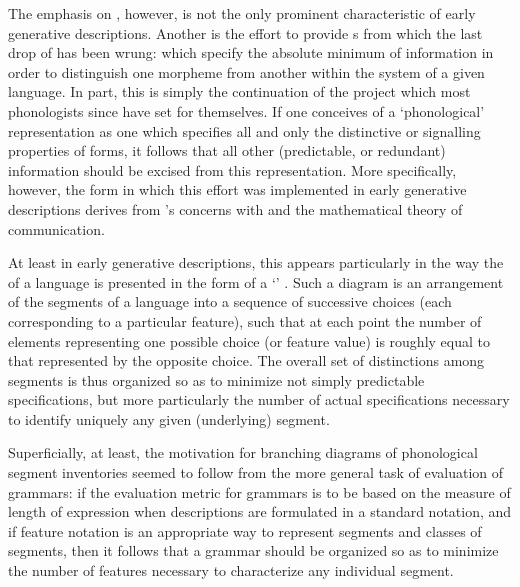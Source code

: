 The emphasis on , however, is not the only prominent
characteristic of early generative descriptions. Another is the effort
to provide s from which the last drop of
 has been wrung:  which specify the absolute
minimum of information in order to distinguish one morpheme from
another within the system of a given language. In part, this is simply
the continuation of the project which most phonologists since {\Saussure}
have set for themselves. If one conceives of a `phonological'
representation as one which specifies all and only the distinctive or
signalling properties of forms, it follows that all other
(predictable, or redundant) information should be excised from this
representation. More specifically, however, the form in which this
effort was implemented in early generative descriptions derives from
{\Jakobson}'s concerns with  and the mathematical
theory of communication.

At least in early generative descriptions, this appears particularly
in the way the  of a language is presented in the
form of a `' \citep{dresher.hall21:genphon}. Such a
diagram is an arrangement of the segments of a language into a
sequence of successive choices (each corresponding to a particular
feature), such that at each point the number of elements representing
one possible choice (or feature value) is roughly equal to that
represented by the opposite choice. The overall set of distinctions
among segments is thus organized so as to minimize not simply
predictable specifications, but more particularly the number of actual
specifications necessary to identify uniquely any given (underlying)
segment.

Superficially, at least, the motivation for branching diagrams of
phonological segment inventories seemed to follow from the more
general task of evaluation of grammars: if the evaluation metric for
grammars is to be based on the measure of length of expression when
descriptions are formulated in a standard notation, and if feature
notation is an appropriate way to represent segments and classes of
segments, then it follows that a grammar should be organized so as to
minimize the number of features necessary to characterize any
individual segment.

